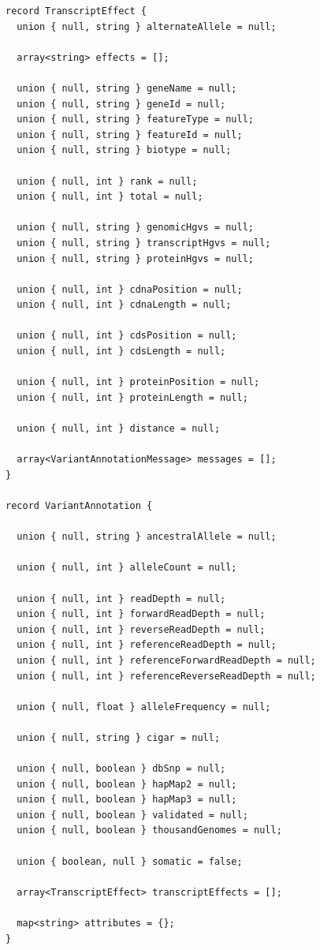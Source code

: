 \documentclass[phd]{ucbthesis}
\begin{document}
\begin{lstlisting}[caption={ADAM} variant annotation schemas]
record TranscriptEffect {
  union { null, string } alternateAllele = null;

  array<string> effects = [];

  union { null, string } geneName = null;
  union { null, string } geneId = null;
  union { null, string } featureType = null;
  union { null, string } featureId = null;
  union { null, string } biotype = null;

  union { null, int } rank = null;
  union { null, int } total = null;

  union { null, string } genomicHgvs = null;
  union { null, string } transcriptHgvs = null;
  union { null, string } proteinHgvs = null;

  union { null, int } cdnaPosition = null;
  union { null, int } cdnaLength = null;

  union { null, int } cdsPosition = null;
  union { null, int } cdsLength = null;

  union { null, int } proteinPosition = null;
  union { null, int } proteinLength = null;

  union { null, int } distance = null;

  array<VariantAnnotationMessage> messages = [];
}

record VariantAnnotation {

  union { null, string } ancestralAllele = null;

  union { null, int } alleleCount = null;

  union { null, int } readDepth = null;
  union { null, int } forwardReadDepth = null;
  union { null, int } reverseReadDepth = null;
  union { null, int } referenceReadDepth = null;
  union { null, int } referenceForwardReadDepth = null;
  union { null, int } referenceReverseReadDepth = null;

  union { null, float } alleleFrequency = null;

  union { null, string } cigar = null;

  union { null, boolean } dbSnp = null;
  union { null, boolean } hapMap2 = null;
  union { null, boolean } hapMap3 = null;
  union { null, boolean } validated = null;
  union { null, boolean } thousandGenomes = null;

  union { boolean, null } somatic = false;

  array<TranscriptEffect> transcriptEffects = [];

  map<string> attributes = {};
}
\end{lstlisting}
\end{document}
